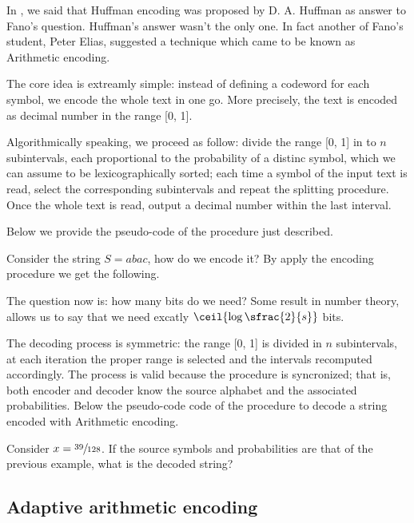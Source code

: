 \documentclass{subfiles}
\begin{document}
\label{sec:arithmeticEncoding}
    In , we said that Huffman encoding was proposed by D. A. Huffman 
        as answer to Fano's question. Huffman's answer wasn't the only one. 
        In fact another of Fano's student, Peter Elias,
        suggested a technique which came to be known as Arithmetic encoding.

    The core idea is extreamly simple: instead of defining a codeword for each 
        symbol, we encode the whole text in one go. More precisely, 
        the text is encoded as decimal number in the range [0, 1].
    
    Algorithmically speaking, we proceed as follow: divide the range [0, 1]
        in to \(n\) subintervals, each proportional to the probability of a distinc symbol,
        which we can assume to be lexicographically sorted; each time a symbol 
        of the input text is read, select the corresponding subintervals and 
        repeat the splitting procedure. Once the whole text is read, 
        output a decimal number within the last interval.

    Below we provide the pseudo-code of the procedure just described.
    

    \begin{example*}
        Consider the string \(S = abac\), how do we encode it? 
            By apply the encoding procedure we get the following.

            
    \end{example*}

    The question now is: how many bits do we need? Some result in number theory,
        allows us to say that we need excatly \(\ceil{\log\sfrac{2}{s}}\) bits.

    The decoding process is symmetric: the range [0, 1] is divided in \(n\)
        subintervals, at each iteration the proper range is selected and 
        the intervals recomputed accordingly. The process is valid 
        because the procedure is syncronized; that is,
        both encoder and decoder know the source alphabet and the associated probabilities.
        Below the pseudo-code code of the procedure to decode a string encoded with Arithmetic encoding.

    
    \begin{example*}
        Consider \(x = \sfrac{39}{128}\). If the source symbols and probabilities 
            are that of the previous example, what is the decoded string?

            
    \end{example*}

    \subsection{Adaptive arithmetic encoding}
    
\end{document}
